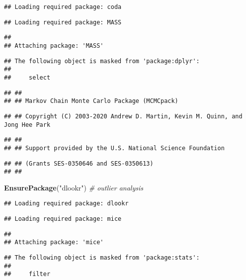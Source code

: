 \documentclass[]{article}
\newenvironment{Shaded}{\begin{snugshade}}{\end{snugshade}}
\newcommand{\CommentTok}[1]{\textcolor[rgb]{0.56,0.35,0.01}{\textit{#1}}}
\newcommand{\KeywordTok}[1]{\textcolor[rgb]{0.13,0.29,0.53}{\textbf{#1}}}
\newcommand{\NormalTok}[1]{#1}
\newcommand{\StringTok}[1]{\textcolor[rgb]{0.31,0.60,0.02}{#1}}
\begin{document}
\begin{verbatim}
## Loading required package: coda
\end{verbatim}

\begin{verbatim}
## Loading required package: MASS
\end{verbatim}

\begin{verbatim}
## 
## Attaching package: 'MASS'
\end{verbatim}

\begin{verbatim}
## The following object is masked from 'package:dplyr':
## 
##     select
\end{verbatim}

\begin{verbatim}
## ##
## ## Markov Chain Monte Carlo Package (MCMCpack)
\end{verbatim}

\begin{verbatim}
## ## Copyright (C) 2003-2020 Andrew D. Martin, Kevin M. Quinn, and Jong Hee Park
\end{verbatim}

\begin{verbatim}
## ##
## ## Support provided by the U.S. National Science Foundation
\end{verbatim}

\begin{verbatim}
## ## (Grants SES-0350646 and SES-0350613)
## ##
\end{verbatim}

\begin{Shaded}
\begin{Highlighting}[]
\KeywordTok{EnsurePackage}\NormalTok{(}\StringTok{"dlookr"}\NormalTok{) }\CommentTok{# outlier analysis}
\end{Highlighting}
\end{Shaded}

\begin{verbatim}
## Loading required package: dlookr
\end{verbatim}

\begin{verbatim}
## Loading required package: mice
\end{verbatim}

\begin{verbatim}
## 
## Attaching package: 'mice'
\end{verbatim}

\begin{verbatim}
## The following object is masked from 'package:stats':
## 
##     filter
\end{verbatim}
\end{document}
